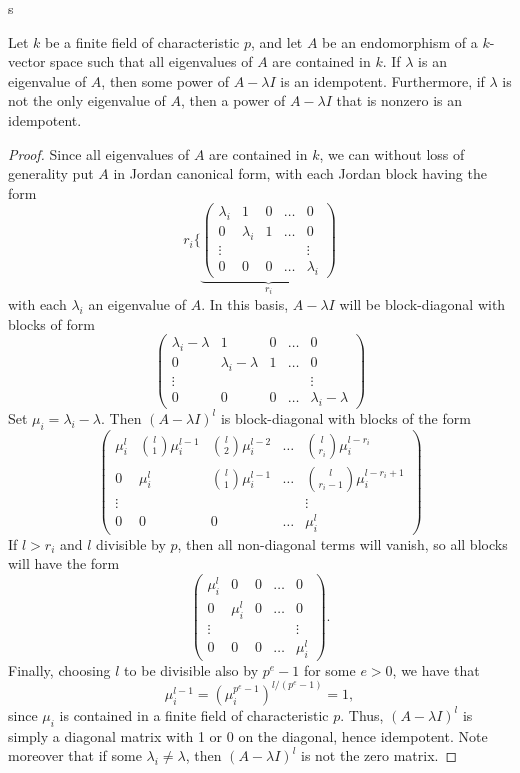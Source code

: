 s\documentclass{article}
\let\l\lambda
\numberwithin{equation}{section}
\theoremstyle{theorem}
\numberwithin{thm}{section}
\theoremstyle{definition}
\begin{document}
\begin{lem}\label{lem:jordan}
  Let $k$ be a finite field of characteristic $p$, and let $A$ be an endomorphism of a $k$-vector space such that all eigenvalues of $A$ are contained in $k$. If $\l$ is an eigenvalue of $A$, then some power of $A-\l I$ is an idempotent.
Furthermore, if $\l$ is not the only eigenvalue of $A$, then a power of $A-\l I$ that is nonzero is an idempotent.
\end{lem}
\begin{proof}
  Since all eigenvalues of $A$ are contained in $k$, we can without loss of generality put $A$ in Jordan canonical form, with each Jordan block having the form
  \[ r_i\Biggl\{
  \underbrace{\begin{pmatrix}
      \l_i & 1 & 0 & \dots & 0 \\
      0 & \l_i & 1  & \dots & 0 \\
      \vdots & & & & \vdots \\
      0 & 0 & 0 & \dots & \l_i
  \end{pmatrix}}_{r_i} \]
  with each $\l_i$ an eigenvalue of $A$.
  In this basis, $A-\l I$ will be block-diagonal with blocks of form
  \[ \begin{pmatrix}
    \l_i-\l & 1 & 0 & \dots & 0 \\
    0 & \l_i-\l & 1 & \dots & 0 \\
    \vdots & & & & \vdots \\
    0 & 0 & 0 & \dots & \l_i-\l
  \end{pmatrix} \]
  Set $\mu_i=\l_i-\l$. Then $(A-\l I)^l$ is block-diagonal with blocks of the form
  \[ \begin{pmatrix}
    \mu_i^l & \binom{l}1\mu_i^{l-1} & \binom{l}2\mu_i^{l-2} & \dots & \binom{l}{r_i}\mu_i^{l-r_i} \\
    0 & \mu_i^l & \binom{l}1\mu_i^{l-1} & \dots & \binom{l}{r_i-1}\mu_i^{l-r_i+1} \\
    \vdots & & & & \vdots \\
    0 & 0 & 0 & \dots & \mu_i^l
  \end{pmatrix} \]
  If $l > r_i$ and $l$ divisible by $p$, then all non-diagonal terms will vanish, so all blocks will have the form
  \[ \begin{pmatrix}
    \mu_i^l & 0 & 0 & \dots & 0 \\
    0 & \mu_i^l & 0 & \dots & 0 \\
    \vdots & & & & \vdots \\
    0 & 0 & 0 & \dots & \mu_i^l
  \end{pmatrix}. \]
  Finally, choosing $l$ to be divisible also by $p^e-1$ for some $e>0$, we have that $$\mu_i^{l-1} = (\mu_i^{p^{e}-1})^{l/(p^{e}-1)} =1,$$ since $\mu_i$ is contained in a finite field of characteristic $p$.
  Thus, $(A-\l I)^l$ is simply a diagonal matrix with 1 or 0 on the diagonal, hence idempotent. Note moreover that if some $\l_i\neq \l$, then $(A-\l I)^l$ is not the zero matrix.
\end{proof}
\end{document}
